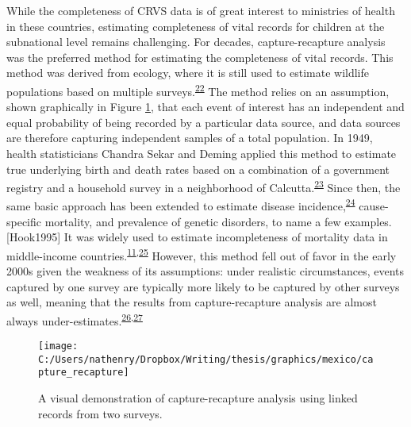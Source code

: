 \documentclass[
]{article}
\begin{document}
While the completeness of CRVS data is of great interest to ministries of health in these countries, estimating completeness of vital records for children at the subnational level remains challenging. For decades, capture-recapture analysis was the preferred method for estimating the completeness of vital records. This method was derived from ecology, where it is still used to estimate wildlife populations based on multiple surveys.\textsuperscript{\protect\hyperlink{ref-Smith1988}{22}} The method relies on an assumption, shown graphically in Figure \ref{fig:capture-recapture}, that each event of interest has an independent and equal probability of being recorded by a particular data source, and data sources are therefore capturing independent samples of a total population. In 1949, health statisticians Chandra Sekar and Deming applied this method to estimate true underlying birth and death rates based on a combination of a government registry and a household survey in a neighborhood of Calcutta.\textsuperscript{\protect\hyperlink{ref-ChandraSekar1949}{23}} Since then, the same basic approach has been extended to estimate disease incidence,\textsuperscript{\protect\hyperlink{ref-Tilling2001a}{24}} cause-specific mortality, and prevalence of genetic disorders, to name a few examples.{[}Hook1995{]} It was widely used to estimate incompleteness of mortality data in middle-income countries.\textsuperscript{\protect\hyperlink{ref-Silva2015}{11},\protect\hyperlink{ref-Becker1996}{25}} However, this method fell out of favor in the early 2000s given the weakness of its assumptions: under realistic circumstances, events captured by one survey are typically more likely to be captured by other surveys as well, meaning that the results from capture-recapture analysis are almost always under-estimates.\textsuperscript{\protect\hyperlink{ref-Tilling2001}{26},\protect\hyperlink{ref-Cormack1999}{27}}

\begin{figure}[!ht]

{\centering \texttt{[image: C:/Users/nathenry/Dropbox/Writing/thesis/graphics/mexico/capture\_recapture]} 

}

\caption{A visual demonstration of capture-recapture analysis using linked records from two surveys.}\label{fig:capture-recapture}
\end{figure}
\end{document}
